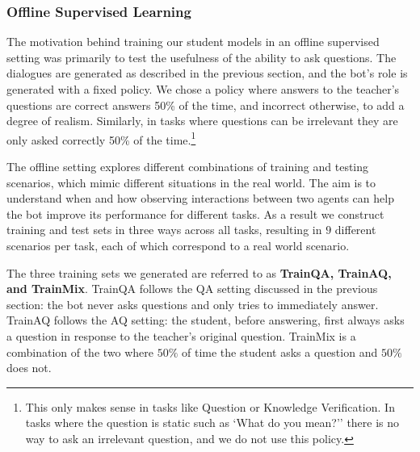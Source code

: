 \subsubsection{Offline Supervised Learning} \label{sec:offline}
The motivation behind training our student models in an offline supervised
setting was primarily to test the usefulness of the ability to ask questions.
The dialogues are generated as described in the previous section,
and the bot's role is generated with a fixed policy.
We chose a policy where answers to the teacher's questions are
correct answers 50\% of the time, and incorrect
otherwise, to add a degree of realism.
Similarly, in tasks where questions can be irrelevant
they are only asked correctly 50\% of the time.\footnote{This only makes sense
in tasks like Question or Knowledge Verification. In tasks where the question is
static such as `What do you mean?'' there is no way to ask an irrelevant question,
and we do not use this policy.}

The offline setting  explores different combinations of training and testing
scenarios, which mimic different situations in the real world.
The aim is to understand when and how observing interactions between two agents
can help the bot improve its performance for different tasks. As a result
we construct training and test sets in three ways across all tasks,
resulting in $9$ different scenarios per task, each of which correspond to
a real world scenario.

The three training sets we generated are referred to as
{\bf TrainQA, TrainAQ, and TrainMix}. TrainQA
 follows the QA setting discussed in the previous section:
the bot never asks questions and only tries to immediately answer.
TrainAQ follows the AQ setting: the student, before answering,
first always asks a question in response to the teacher's original question.
TrainMix is a combination of the two
where $50\%$ of time the student asks a question and $50\%$ does not.



